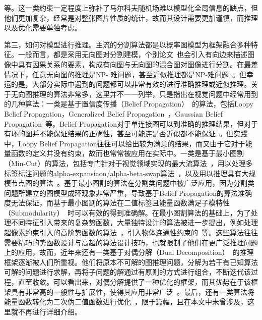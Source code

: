 等。这一类约束一定程度上弥补了马尔科夫随机场难以模型化全局信息的缺点，但他们更加复杂，经常是对整张图片性质的统计，故而其设计需要更加谨慎，而推理以及优化需要单独考虑。

第三，如何对模型进行推理。主流的分割算法都是以概率图模型为框架融合多种特征。一般而言，都是采用无向图对分割建模，个别论文~\cite{unifiedgm}也会引入有向边来描述图像中具有因果关系的要素，构成有向图与无向图的混合图对图像进行分割。在最差情况下，任意无向图的推理是NP- 难问题，甚至近似推理都是NP-难问题~\cite{kollerpgm}。但幸运的是，大部分实际中遇到的问题都可以非常有效的进行准确推理或近似推理。关于无向图推理的算法非常多，这里并不一一列举，只是指出在视觉问题中经常用到的几种算法：一类是基于置信度传播（Belief Propagation）~\cite{bp}的算法，包括Loopy Belief Propagation，Generalized Belief Propagation~\cite{gbp}，Gaussian Belief Propagation~\cite{gaussianbp}等。Belief Propagation对于单连接图可以到准确的推理结果，但对于有环的图并不能保证结果的正确性，甚至可能连是否近似都不能保证~\cite{emplbp}。但实践中，Loopy Belief Propagation往往可以给出较为满意的结果，而又由于它对于能量函数的定义并没有约束，故而也常常被应用在实际中。一类是基于最小图割（Min-Cut）的算法，包括专门针对于视觉领域实现的最大流算法~\cite{expmincut}，用以处理多标签标注问题的alpha-expansiaon/alpha-beta-swap算法~\cite{expmincut}\cite{whatenergy}\cite{fastgc}，以及用以推理具有大规模节点图的算法~\cite{scalablegc}。基于最小图割的算法在分割类问题中被广泛应用，因为分割类问题所建立的图模型成环现象非常严重，导致基于Belief Propagation的算法准确度无法保证，而基于最小图割的算法在二值标签且能量函数满足子模特性（Submodularity）~\cite{whatenergy}时可以有效的得到准确解。在最小图割算法的基础上，为了处理不同特征引入带来的复杂势函数，大量独特设计的算法被进一步提出，例如处理超像素约束引入的高阶势函数的算法~\cite{robusthighorder}，引入物体连通性约束的~\cite{topocut}\cite{conncut}等。这些算法往往需要精巧的势函数设计与高超的算法设计技巧，也就限制了他们在更广泛推理问题上的应用，故而，近年来还有一类基于对偶分解（Dual Decomposition）~\cite{dualdecomp}的推理框架逐渐被人们所重视。他们将原本不可解的图推理问题，分解为若干有已知算法可解的问题进行求解，再将子问题的解通过有原则的方式进行组合，不断迭代该过程，直至收敛。可以看出来，对偶分解提供了一种优化的框架，而其优势在于该框架具有非常高的一般性与扩展性，使得其应用非常广泛~\cite{conncut}\cite{beyondpw}\cite{beyondlp}\cite{jointsegapp}。最后，还有一类算法将能量函数转化为二次伪二值函数进行优化~\cite{sparsehighorder}\cite{cliqueqpbf}\cite{exacthighorder}\cite{branchmincut}，限于篇幅，且在本文中未曾涉及，这里就不再进行详细介绍。

